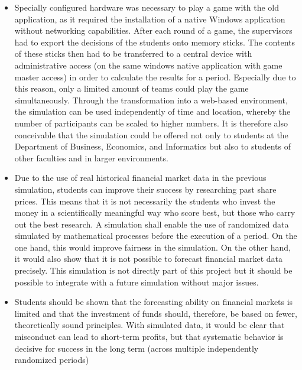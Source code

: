 \begin{itemize}
  \item Specially configured hardware was necessary to play a game with the old application, as it required the installation of a native Windows application without networking capabilities. After each round of a game, the supervisors had to export the decisions of the students onto memory sticks. The contents of these sticks then had to be transferred to a central device with administrative access (on the same windows native application with game master access) in order to calculate the results for a period. Especially due to this reason, only a limited amount of teams could play the game simultaneously. Through the transformation into a web-based environment, the simulation can be used independently of time and location, whereby the number of participants can be scaled to higher numbers. It is therefore also conceivable that the simulation could be offered not only to students at the Department of Business, Economics, and Informatics but also to students of other faculties and in larger environments.
  \item Due to the use of real historical financial market data in the previous simulation, students can improve their success by researching past share prices. This means that it is not necessarily the students who invest the money in a scientifically meaningful way who score best, but those who carry out the best research. A simulation shall enable the use of randomized data simulated by mathematical processes before the execution of a period. On the one hand, this would improve fairness in the simulation. On the other hand, it would also show that it is not possible to forecast financial market data precisely. This simulation is not directly part of this project but it should be possible to integrate with a future simulation without major issues.
  \item Students should be shown that the forecasting ability on financial markets is limited and that the investment of funds should, therefore, be based on fewer, theoretically sound principles. With  simulated data, it would be clear that misconduct can lead to short-term profits, but that systematic behavior is decisive for success in the long term (across multiple independently randomized periods)
\end{itemize}


\newpage
